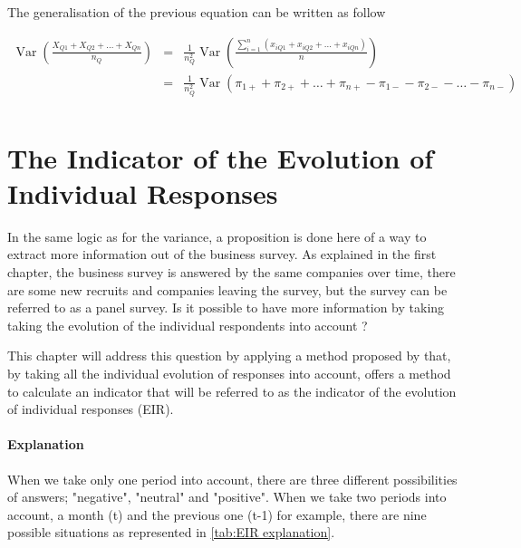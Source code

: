 \documentclass[12pt,a4paper,oneside]{book}
\DeclareMathOperator{\Var}{Var}
\begin{document}
The generalisation of the previous equation can be written as follow

\begin{eqnarray}
    \Var \left(\frac{X_{Q1} + X_{Q2} + \ldots + X_{Qn}}{n_Q} \right) 
    &=& \frac{1}{n_Q^2} \Var \left(\frac{\sum_{i=1}^n \left(x_{i Q1} + x_{i Q2} + ... + x_{i Qn} \right)}{n} \right) \nonumber \\
    &=& \frac{1}{n_Q^2} \Var \left(\pi_{1+} + \pi_{2+} + \ldots + \pi_{n+} - \pi_{1-} - \pi_{2-} - \ldots - \pi_{n-} \right) \nonumber \\
\end{eqnarray}

\chapter{The Indicator of the Evolution of Individual Responses}

In the same logic as for the variance, a proposition is done here of a way to extract more information out of the business survey. 
As explained in the first chapter, the business survey is answered by the same companies over time, there are some new recruits and companies leaving the survey, but the survey can be referred to as a panel survey.
Is it possible to have more information by taking taking the evolution of the individual respondents into account ? 

This chapter will address this question by applying a method proposed by \cite{caron_estimation_1996} that, by taking all the individual evolution of responses into account, offers a method to calculate an indicator that will be referred to as the indicator of the evolution of individual responses (EIR).



\subsubsection{Explanation}

When we take only one period into account, there are three different possibilities of answers; "negative", "neutral" and "positive".
When we take two periods into account, a month (t) and the previous one (t-1) for example, there are nine possible situations as represented in \autoref{tab:EIR explanation}. 
\end{document}
